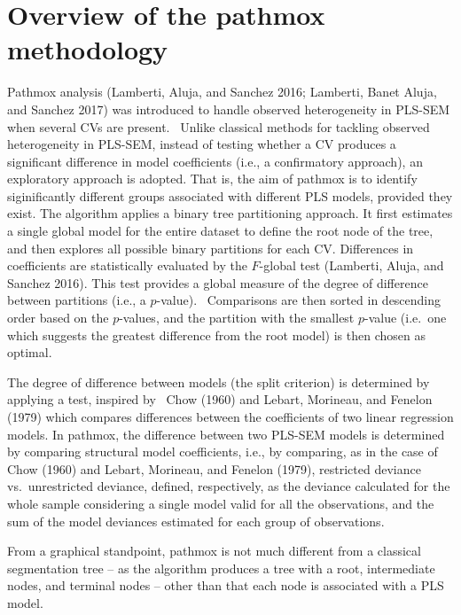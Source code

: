 \hypertarget{overview-of-the-pathmox-methodology}{%
\section{Overview of the pathmox methodology}\label{overview-of-the-pathmox-methodology}}

Pathmox analysis (Lamberti, Aluja, and Sanchez 2016; Lamberti, Banet Aluja, and Sanchez 2017) was introduced to handle
observed heterogeneity in PLS-SEM when several CVs are present. ~Unlike
classical methods for tackling observed heterogeneity in PLS-SEM,
instead of testing whether a CV produces a significant difference in
model coefficients (i.e., a confirmatory approach), an exploratory
approach is adopted. That is, the aim of pathmox is to identify
siginificantly different groups associated with different PLS models,
provided they exist. The algorithm applies a binary tree partitioning
approach. It first estimates a single global model for the entire
dataset to define the root node of the tree, and then explores all
possible binary partitions for each CV. Differences in coefficients are
statistically evaluated by the \(F\)-global test (Lamberti, Aluja, and Sanchez 2016). This test
provides a global measure of the degree of difference between partitions
(i.e., a \(p\)-value). ~Comparisons are then sorted in descending order
based on the \(p\)-values, and the partition with the smallest \(p\)-value
(i.e.~one which suggests the greatest difference from the root model) is
then chosen as optimal.~

The degree of difference between models (the split criterion) is
determined by applying a test, inspired by ~Chow (1960) and Lebart, Morineau, and Fenelon (1979) which
compares differences between the coefficients of two linear regression
models. In pathmox, the difference between two PLS-SEM models is
determined by comparing structural model coefficients, i.e., by
comparing, as in the case of Chow (1960) and Lebart, Morineau, and Fenelon (1979), restricted deviance
vs.~unrestricted deviance, defined, respectively, as the deviance
calculated for the whole sample considering a single model valid for all
the observations, and the sum of the model deviances estimated for each
group of observations. ~

From a graphical standpoint, pathmox is not much different from a
classical segmentation tree -- as the algorithm produces a tree with a
root, intermediate nodes, and terminal nodes -- other than that each
node is associated with a PLS model.~

